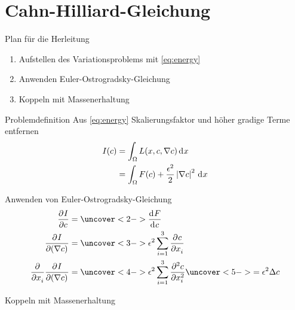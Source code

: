 
\section{Cahn-Hilliard-Gleichung}

\begin{frame}{Plan für die Herleitung}
\begin{enumerate}
\item Aufstellen des Variationsproblems mit \eqref{eq:energy}
\item Anwenden Euler-Ostrogradsky-Gleichung
\item Koppeln mit Massenerhaltung
\end{enumerate}
\end{frame}

\begin{frame}{Problemdefinition}
Aus \eqref{eq:energy} Skalierungsfaktor und höher gradige Terme entfernen
\begin{align}
I(c)
&=
\int_\Omega L(x, c, \nabla c) \di{x}
\nonumber
\\
&=
\int_\Omega F(c) + \frac{\epsilon^2}{2} \abs{\nabla c}^2 \di{x}
\end{align}
\end{frame}

\begin{frame}{Anwenden von Euler-Ostrogradsky-Gleichung}
\begin{align*}
\pderiv{I}{c}
&=
\uncover<2->{
\deriv{F}{c}
}
\\
\pderiv{I}{(\nabla c)}
&=
\uncover<3->{
\epsilon^2 \sum_{i=1}^3 \pderiv{c}{x_i}
}
\\
\pderiv{}{x_i}\pderiv{I}{(\nabla c)}
&=
\uncover<4->{
\epsilon^2 \sum_{i=1}^3 \pderiv[2]{c}{x_i}
}
\uncover<5->{
=
\epsilon^2 \Delta c
}
\end{align*}
\end{frame}


\begin{frame}{Koppeln mit Massenerhaltung}
\end{frame}

